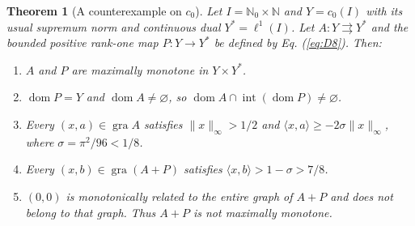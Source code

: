 \documentclass[11pt]{article}
\newcommand{\N}{\mathbb N}
\newcommand{\Nzero}{\mathbb N_0}
\newcommand{\gra}{\operatorname{gra}}
\newcommand{\dom}{\operatorname{dom}}
\newcommand{\pair}[2]{\langle #1,#2\rangle}
\newtheorem{theorem}{Theorem}
\theoremstyle{definition}
\theoremstyle{remark}
\begin{document}
\begin{theorem}[A counterexample on $c_0$]\label{thm:C}
Let $I=\Nzero\times\N$ and $Y=c_0(I)$ with its usual supremum norm and continuous dual $Y^*=\ell^1(I)$. Let $A:Y\rightrightarrows Y^*$ and the bounded positive rank-one map $P:Y\to Y^*$ be defined by Eq. (\ref{eq:D8}). Then:
\begin{enumerate}
\item\label{thm:C-maximality} $A$ and $P$ are maximally monotone in $Y\times Y^*$.
\item\label{thm:C-domain} $\dom P=Y$ and $\dom A\ne\varnothing$, so
$\dom A\cap\operatorname{int}(\dom P)\ne\varnothing$.
\item\label{thm:C-bound} Every $(x,a)\in\gra A$ satisfies $\|x\|_\infty>1/2$ and
$\pair{x}{a}\ge-2\sigma\|x\|_\infty$, where $\sigma=\pi^2/96<1/8$.
\item\label{thm:C-pairing} Every $(x,b)\in\gra(A+P)$ satisfies
$\pair{x}{b}>1-\sigma>7/8$.
\item\label{thm:C-sum} $(0,0)$ is monotonically related to the entire graph of $A+P$ and
does not belong to that graph. Thus $A+P$ is not maximally monotone.
\end{enumerate}
\end{theorem}
\end{document}
